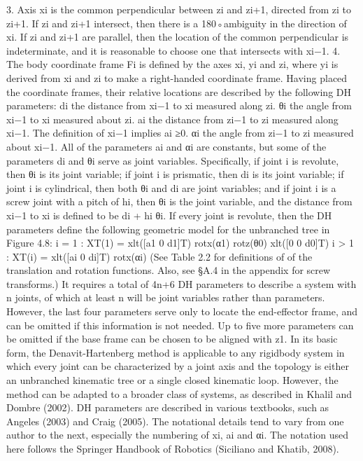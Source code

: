 3. Axis xi is the common perpendicular between zi and zi+1, directed from zi to zi+1. If zi and zi+1 intersect, then there is a 180◦ambiguity in the direction of xi. If zi and zi+1 are parallel, then the location of the common perpendicular is indeterminate, and it is reasonable to choose one that intersects with xi−1. 4. The body coordinate frame Fi is defined by the axes xi, yi and zi, where yi is derived from xi and zi to make a right-handed coordinate frame. Having placed the coordinate frames, their relative locations are described by the following DH parameters: di the distance from xi−1 to xi measured along zi. θi the angle from xi−1 to xi measured about zi. ai the distance from zi−1 to zi measured along xi−1. The definition of xi−1 implies ai ≥0. αi the angle from zi−1 to zi measured about xi−1. All of the parameters ai and αi are constants, but some of the parameters di and θi serve as joint variables. Specifically, if joint i is revolute, then θi is its joint variable; if joint i is prismatic, then di is its joint variable; if joint i is cylindrical, then both θi and di are joint variables; and if joint i is a screw joint with a pitch of hi, then θi is the joint variable, and the distance from xi−1 to xi is defined to be di + hi θi. If every joint is revolute, then the DH parameters define the following geometric model for the unbranched tree in Figure 4.8: i = 1 : XT(1) = xlt([a1 0 d1]T) rotx(α1) rotz(θ0) xlt([0 0 d0]T) i > 1 : XT(i) = xlt([ai 0 di]T) rotx(αi) (See Table 2.2 for definitions of of the translation and rotation functions. Also, see §A.4 in the appendix for screw transforms.) It requires a total of 4n+6 DH parameters to describe a system with n joints, of which at least n will be joint variables rather than parameters. However, the last four parameters serve only to locate the end-effector frame, and can be omitted if this information is not needed. Up to five more parameters can be omitted if the base frame can be chosen to be aligned with z1. In its basic form, the Denavit-Hartenberg method is applicable to any rigidbody system in which every joint can be characterized by a joint axis and the topology is either an unbranched kinematic tree or a single closed kinematic loop. However, the method can be adapted to a broader class of systems, as described in Khalil and Dombre (2002). DH parameters are described in various textbooks, such as Angeles (2003) and Craig (2005). The notational details tend to vary from one author to the next, especially the numbering of xi, ai and αi. The notation used here follows the Springer Handbook of Robotics (Siciliano and Khatib, 2008).

